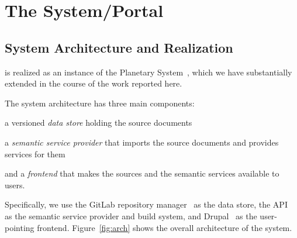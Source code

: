 \section{The \sys System/Portal}\label{sec:mathhub}

\subsection{System Architecture and Realization}\label{sec:arch}

\sys is realized as an instance of the Planetary System~\cite{Kohlhase:ppte12}, which we
have substantially extended in the course of the work reported here.

The system architecture has three main components: 
\begin{compactenum}[\em i\rm)]
 \item a versioned \emph{data store} holding the source documents
 \item a \emph{semantic service provider} that imports the source documents and provides services for them 
 \item and a \emph{frontend} that makes the sources and the semantic services available to users.
\end{compactenum}
Specifically, we use the GitLab repository manager~\cite{GitLab:on} as the data store, the
\mmt API~\cite{Rabe:MAGMS13,uniformal:on} as the semantic service provider and build
system, and Drupal~\cite{drupal:on} as the user-pointing frontend.  Figure~\ref{fig:arch}
shows the overall architecture of the \sys system.

